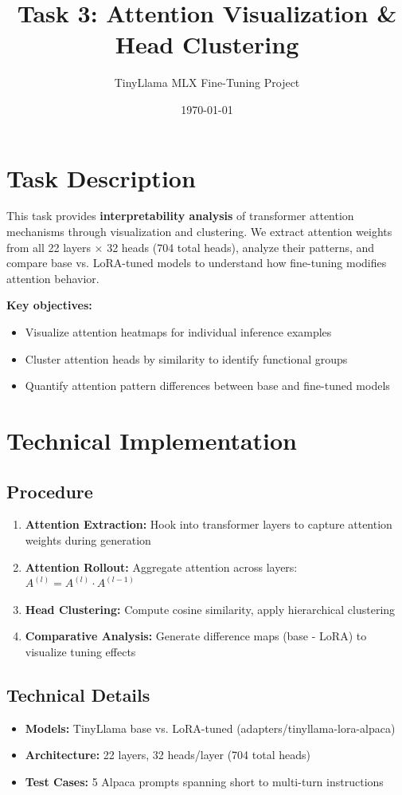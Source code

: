\documentclass[11pt,a4paper]{article}
\title{\textbf{Task 3: Attention Visualization \& Head Clustering}}
\author{TinyLlama MLX Fine-Tuning Project}
\date{\today}
\begin{document}
\maketitle

\section*{Task Description}
This task provides \textbf{interpretability analysis} of transformer attention mechanisms through visualization and clustering. We extract attention weights from all 22 layers × 32 heads (704 total heads), analyze their patterns, and compare base vs. LoRA-tuned models to understand how fine-tuning modifies attention behavior.

\textbf{Key objectives:}
\begin{itemize}
    \item Visualize attention heatmaps for individual inference examples
    \item Cluster attention heads by similarity to identify functional groups
    \item Quantify attention pattern differences between base and fine-tuned models
\end{itemize}

\section*{Technical Implementation}

\subsection*{Procedure}
\begin{enumerate}
    \item \textbf{Attention Extraction:} Hook into transformer layers to capture attention weights during generation
    \item \textbf{Attention Rollout:} Aggregate attention across layers: $A^{(l)} = A^{(l)} \cdot A^{(l-1)}$
    \item \textbf{Head Clustering:} Compute cosine similarity, apply hierarchical clustering
    \item \textbf{Comparative Analysis:} Generate difference maps (base - LoRA) to visualize tuning effects
\end{enumerate}

\subsection*{Technical Details}
\begin{itemize}
    \item \textbf{Models:} TinyLlama base vs. LoRA-tuned (adapters/tinyllama-lora-alpaca)
    \item \textbf{Architecture:} 22 layers, 32 heads/layer (704 total heads)
    \item \textbf{Test Cases:} 5 Alpaca prompts spanning short to multi-turn instructions
\end{itemize}
\end{document}
